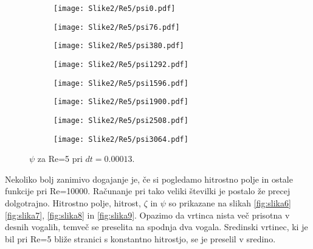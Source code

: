 \documentclass[12pt,a4paper]{article}
\begin{document}
\begin{figure}[H]
    \centering
    \begin{subfigure}[b]{0.2\textwidth}  			
        \texttt{[image: Slike2/Re5/psi0.pdf]}
    \end{subfigure}
    \begin{subfigure}[b]{0.2\textwidth}  			
        \texttt{[image: Slike2/Re5/psi76.pdf]}
    \end{subfigure}
    \begin{subfigure}[b]{0.2\textwidth}  			
        \texttt{[image: Slike2/Re5/psi380.pdf]}
    \end{subfigure}
        \begin{subfigure}[b]{0.2\textwidth}  			
        \texttt{[image: Slike2/Re5/psi1292.pdf]}
    \end{subfigure}
 
     \begin{subfigure}[b]{0.2\textwidth}  			
        \texttt{[image: Slike2/Re5/psi1596.pdf]}
    \end{subfigure}
        \begin{subfigure}[b]{0.2\textwidth}  			
        \texttt{[image: Slike2/Re5/psi1900.pdf]}
    \end{subfigure}
        \begin{subfigure}[b]{0.2\textwidth}  			
        \texttt{[image: Slike2/Re5/psi2508.pdf]}
    \end{subfigure}
        \begin{subfigure}[b]{0.2\textwidth}  			
        \texttt{[image: Slike2/Re5/psi3064.pdf]}
    \end{subfigure}
    \caption{$\psi$ za Re=5 pri $dt=0.00013$.} \label{fig:slika5}
\end{figure}


Nekoliko bolj zanimivo dogajanje je, če si pogledamo hitrostno polje  in ostale funkcije pri Re=10000. Računanje pri tako veliki številki je postalo že precej dolgotrajno. Hitrostno polje, hitrost, $\zeta$ in $\psi$ so prikazane na slikah \ref{fig:slika6} \ref{fig:slika7}, \ref{fig:slika8} in \ref{fig:slika9}. Opazimo da vrtinca nista več prisotna v desnih vogalih, temveč se preselita na spodnja dva vogala. Sredinski vrtinec, ki je bil pri Re=5 bliže stranici s konstantno hitrostjo, se je preselil v sredino.
\end{document}
